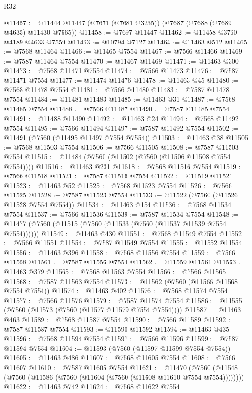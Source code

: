 \begin{lexlean}{R32}
\begin{coremodule}
@11457 := @11444 @11447 (@7671 (@7681 @3235)) (@7687 (@7688 (@7689 @4635) @11430 @7665))
@11458 := @7697 @11447
@11462 := @11458 @3760 @4189 @4633 @7559
@11463 := @10794 @7127
@11464 := @11463 @512
@11465 := @7568 @11464
@11466 := @11465 @7554
@11467 := @7566 @11466
@11469 := @7587 @11464 @7554
@11470 := @11467 @11469
@11471 := @11463 @300
@11473 := @7568 @11471 @7554
@11474 := @7566 @11473
@11476 := @7587 @11471 @7554
@11477 := @11474 @11476
@11478 := @11463 @45
@11480 := @7568 @11478 @7554
@11481 := @7566 @11480
@11483 := @7587 @11478 @7554
@11484 := @11481 @11483
@11485 := @11463 @31
@11487 := @7568 @11485 @7554
@11488 := @7566 @11487
@11490 := @7587 @11485 @7554
@11491 := @11488 @11490
@11492 := @11463 @24
@11494 := @7568 @11492 @7554
@11495 := @7566 @11494
@11497 := @7587 @11492 @7554
@11502 := @11491 (@7560 (@11495 @11497 @7554 @7554))
@11503 := @11463 @38
@11505 := @7568 @11503 @7554
@11506 := @7566 @11505
@11508 := @7587 @11503 @7554
@11515 := @11484 (@7560 (@11502 (@7560 (@11506 @11508 @7554 @7554))))
@11516 := @11463 @231
@11518 := @7568 @11516 @7554
@11519 := @7566 @11518
@11521 := @7587 @11516 @7554
@11522 := @11519 @11521
@11523 := @11463 @52
@11525 := @7568 @11523 @7554
@11526 := @7566 @11525
@11528 := @7587 @11523 @7554
@11533 := @11522 (@7560 (@11526 @11528 @7554 @7554))
@11534 := @11463 @154
@11536 := @7568 @11534 @7554
@11537 := @7566 @11536
@11539 := @7587 @11534 @7554
@11548 := @11477 (@7560 (@11515 (@7560 (@11533 (@7560 (@11537 @11539 @7554 @7554))))))
@11549 := @11463 @430
@11551 := @7568 @11549 @7554
@11552 := @7566 @11551
@11554 := @7587 @11549 @7554
@11555 := @11552 @11554
@11556 := @11463 @396
@11558 := @7568 @11556 @7554
@11559 := @7566 @11558
@11561 := @7587 @11556 @7554
@11562 := @11559 @11561
@11563 := @11463 @379
@11565 := @7568 @11563 @7554
@11566 := @7566 @11565
@11568 := @7587 @11563 @7554
@11573 := @11562 (@7560 (@11566 @11568 @7554 @7554))
@11574 := @11463 @402
@11576 := @7568 @11574 @7554
@11577 := @7566 @11576
@11579 := @7587 @11574 @7554
@11586 := @11555 (@7560 (@11573 (@7560 (@11577 @11579 @7554 @7554))))
@11587 := @11463 @463
@11589 := @7568 @11587 @7554
@11590 := @7566 @11589
@11592 := @7587 @11587 @7554
@11593 := @11590 @11592
@11594 := @11463 @435
@11596 := @7568 @11594 @7554
@11597 := @7566 @11596
@11599 := @7587 @11594 @7554
@11604 := @11593 (@7560 (@11597 @11599 @7554 @7554))
@11605 := @11463 @486
@11607 := @7568 @11605 @7554
@11608 := @7566 @11607
@11610 := @7587 @11605 @7554
@11621 := @11470
    (@7560 (@11548 (@7560 (@11586 (@7560 (@11604 (@7560 (@11608 @11610 @7554 @7554))))))))
@11622 := @11463 @742
@11624 := @7568 @11622 @7554

\end{coremodule}
\end{lexlean}

